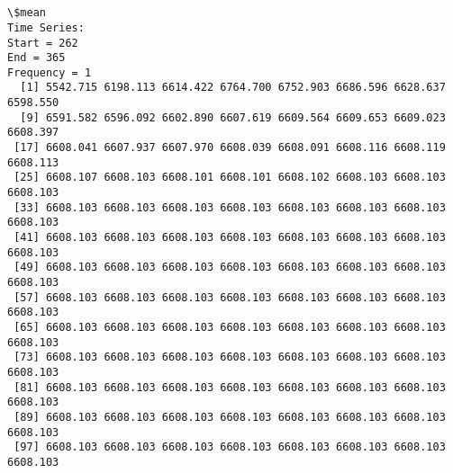 \documentclass[11pt]{article}
\begin{document}
    \begin{center}
    \end{center}
    { \hspace*{\fill} \\}
    
    \begin{center}
    \end{center}
    { \hspace*{\fill} \\}
    
    \begin{Verbatim}[commandchars=\\\{\}]
\$mean
Time Series:
Start = 262 
End = 365 
Frequency = 1 
  [1] 5542.715 6198.113 6614.422 6764.700 6752.903 6686.596 6628.637 6598.550
  [9] 6591.582 6596.092 6602.890 6607.619 6609.564 6609.653 6609.023 6608.397
 [17] 6608.041 6607.937 6607.970 6608.039 6608.091 6608.116 6608.119 6608.113
 [25] 6608.107 6608.103 6608.101 6608.101 6608.102 6608.103 6608.103 6608.103
 [33] 6608.103 6608.103 6608.103 6608.103 6608.103 6608.103 6608.103 6608.103
 [41] 6608.103 6608.103 6608.103 6608.103 6608.103 6608.103 6608.103 6608.103
 [49] 6608.103 6608.103 6608.103 6608.103 6608.103 6608.103 6608.103 6608.103
 [57] 6608.103 6608.103 6608.103 6608.103 6608.103 6608.103 6608.103 6608.103
 [65] 6608.103 6608.103 6608.103 6608.103 6608.103 6608.103 6608.103 6608.103
 [73] 6608.103 6608.103 6608.103 6608.103 6608.103 6608.103 6608.103 6608.103
 [81] 6608.103 6608.103 6608.103 6608.103 6608.103 6608.103 6608.103 6608.103
 [89] 6608.103 6608.103 6608.103 6608.103 6608.103 6608.103 6608.103 6608.103
 [97] 6608.103 6608.103 6608.103 6608.103 6608.103 6608.103 6608.103 6608.103


\end{Verbatim}
\end{document}
